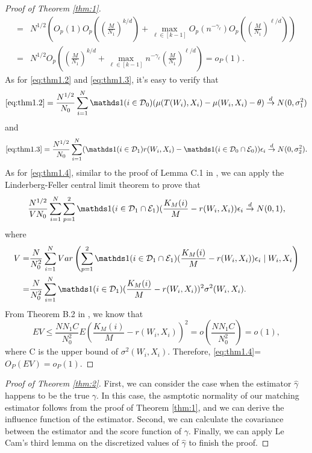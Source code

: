 \documentclass[11pt]{article}
\numberwithin{equation}{section}
\theoremstyle{definition}
\begin{document}
\begin{proof}[Proof of Theorem \ref{thm:1}]
\begin{align*}
=& N^{1/2}\left(O_p(1)O_p\left(\left(\frac{M}{N_1}\right)^{k/d}\right) + \max_{\ell \in [k-1]} O_p(n^{-\gamma_{\ell}}) O_p\left(\left(\frac{M}{N_1}\right)^{\ell/d}\right)\right)\\
=& N^{1/2}O_p\left(\left(\frac{M}{N_1}\right)^{k/d} + \max_{\ell \in [k-1]}n^{-\gamma_{\ell}} \left(\frac{M}{N_1}\right)^{\ell/d}\right)=o_P(1).
\end{align*}
As for \eqref{eq:thm1.2} and \eqref{eq:thm1.3}, it's easy to verify that
\[\eqref{eq:thm1.2}=\frac{N^{1/2}}{N_0}\sum_{i=1}^N\ind(i\in\mathcal{D}_0)(\mu(T(W_i),X_i)-\mu(W_i,X_i)-\theta)\overset{d}{\to}N(0,\sigma_1^2)\]
and 
\[\eqref{eq:thm1.3}=\frac{N^{1/2}}{N_0}\sum_{i=1}^N(\ind(i\in\mathcal{D}_1)r(W_i,X_i)-\ind(i\in\mathcal{D}_0\cap\mathcal{E}_0))\epsilon_i\overset{d}{\to}N(0,\sigma_2^2).\]
As for \eqref{eq:thm1.4}, similar to the proof of Lemma C.1 in \cite{lin2023estimation}, we can apply the Linderberg-Feller central limit theorem to prove that 
\[\frac{N^{1/2}}{VN_0}\sum_{i=1}^N\sum_{p=1}^2\ind(i\in\mathcal{D}_1\cap\mathcal{E}_1)(\frac{K_M(i)}{M}-r(W_i,X_i))\epsilon_i\overset{d}{\to}N(0,1),\]
where
\begin{align*}
     V=&\frac{N}{N_0^2}\sum_{i=1}^NVar\left(\sum_{p=1}^2\ind(i\in\mathcal{D}_1\cap\mathcal{E}_1)(\frac{K_M(i)}{M}-r(W_i,X_i))\epsilon_i\mid W_i,X_i\right)\\
     =&\frac{N}{N_0^2}\sum_{i=1}^N \ind(i\in\mathcal{D}_1)(\frac{K_M(i)}{M}-r(W_i,X_i))^2\sigma^2(W_i,X_i).
\end{align*}
From Theorem B.2 in \cite{lin2023estimation}, we know that
\[EV\leq \frac{NN_1C}{N_0^2}E\left(\frac{K_M(i)}{M}-r(W_i,X_i)\right)^2=o\left(\frac{NN_1C}{N_0^2}\right)=o(1),\]
where C is the upper bound of $\sigma^2(W_i,X_i)$. Therefore, \eqref{eq:thm1.4}=$O_P(EV)=o_P(1).$ 
\end{proof}

\begin{proof}[Proof of Theorem \ref{thm:2}]
    First, we can consider the case when the estimator $\widehat{\gamma}$ happens to be the true $\gamma$. In this case, the asmptotic normality of our matching estimator follows from the proof of Theorem \ref{thm:1}, and we can derive the influence function of the estimator. Second, we can calculate the covariance between the estimator and the score function of $\gamma$. Finally, we can apply Le Cam's third lemma on the discretized values of $\widehat{\gamma}$ to finish the proof.
\end{proof}
{%


}
\end{document}
